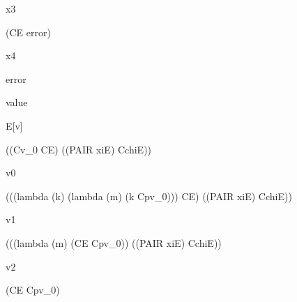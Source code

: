 \documentclass[ms,electronic,twosidetoc,letterpaper,chaptercenter,parttop]{byumsphd}
\begin{document}
\begin{singlespace}
x3
\begin{schemedisplay}
(CE error)
\end{schemedisplay}

x4
\begin{schemedisplay}
error
\end{schemedisplay}

value
\begin{schemedisplay}
E[v]
\end{schemedisplay}

\begin{schemedisplay}
((Cv_0 CE) ((PAIR xiE) CchiE))
\end{schemedisplay}

v0
\begin{schemedisplay}
(((lambda (k) (lambda (m) (k Cpv_0))) CE) ((PAIR xiE) CchiE))
\end{schemedisplay}

v1
\begin{schemedisplay}
(((lambda (m) (CE Cpv_0)) ((PAIR xiE) CchiE))
\end{schemedisplay}

v2
\begin{schemedisplay}
(CE Cpv_0)
\end{schemedisplay}
\end{singlespace}



\end{document}
